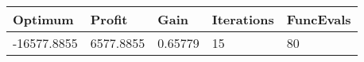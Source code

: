 \begin{tabular}{lllll}
Optimum & Profit & Gain & Iterations & FuncEvals \\ 
\hline 
-16577.8855 & 6577.8855 & 0.65779 & 15 & 80 \\ 
\hline 
\end{tabular}